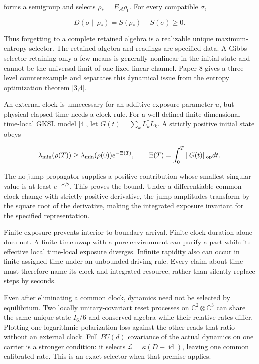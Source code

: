 \documentclass[
  11pt,
  a4paper,
]{article}
\begin{document}
forms a semigroup and selects \(\rho_*=E_{\mathcal A}\rho_0\). For every compatible \(\sigma\),

\[D(\sigma\|\rho_*)=S(\rho_*)-S(\sigma)\ge0.\]

Thus forgetting to a complete retained algebra is a realizable unique maximum-entropy selector. The retained algebra and readings are specified data. A Gibbs selector retaining only a few means is generally nonlinear in the initial state and cannot be the universal limit of one fixed linear channel. Paper 8 gives a three-level counterexample and separates this dynamical issue from the entropy optimization theorem {[}3,4{]}.

An external clock is unnecessary for an additive exposure parameter \(u\), but physical elapsed time needs a clock rule. For a well-defined finite-dimensional time-local GKSL model {[}4{]}, let \(G(t)=\sum_kL_k^\dagger L_k\). A strictly positive initial state obeys

\[\lambda_{\min}(\rho(T))\ge\lambda_{\min}(\rho(0))e^{-\Xi(T)},
\qquad\Xi(T)=\int_0^T\|G(t)\|_{\rm op}dt.\]

The no-jump propagator supplies a positive contribution whose smallest singular value is at least \(e^{-\Xi/2}\). This proves the bound. Under a differentiable common clock change with strictly positive derivative, the jump amplitudes transform by the square root of the derivative, making the integrated exposure invariant for the specified representation.

Finite exposure prevents interior-to-boundary arrival. Finite clock duration alone does not. A finite-time swap with a pure environment can purify a part while its effective local time-local exposure diverges. Infinite rapidity also can occur in finite assigned time under an unbounded driving rule. Every claim about time must therefore name its clock and integrated resource, rather than silently replace steps by seconds.

Even after eliminating a common clock, dynamics need not be selected by equilibrium. Two locally unitary-covariant reset processes on \(\mathbb C^2\otimes\mathbb C^3\) can share the same unique state \(I_6/6\) and conserved algebra while their relative rates differ. Plotting one logarithmic polarization loss against the other reads that ratio without an external clock. Full \(PU(d)\) covariance of the actual dynamics on one carrier is a stronger condition: it selects \(\mathcal L=\kappa(D-\operatorname{id})\), leaving one common calibrated rate. This is an exact selector when that premise applies.
\end{document}
